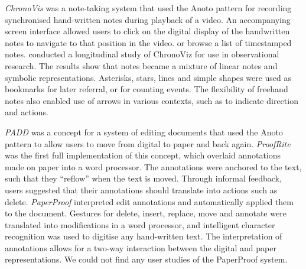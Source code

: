 \textit{ChronoVis} \citep{Fouse2011} was a note-taking system that used the Anoto pattern for recording synchronised
hand-written notes during playback of a video. An accompanying screen interface allowed users to click on the digital
display of the handwritten notes to navigate to that position in the video.  or browse a list of timestamped notes.
\citet{Weibel2012} conducted a longitudinal study of ChronoViz for use in observational research. The results show that
notes became a mixture of linear notes and symbolic representations.  Asterisks, stars, lines and simple shapes were
used as bookmarks for later referral, or for counting events.  The flexibility of freehand notes also enabled use of
arrows in various contexts, such as to indicate direction and actions.

\textit{PADD} \citep{Guimbretiere2003} was a concept for a system of editing documents that used the Anoto pattern to
allow users to move from digital to paper and back again.  \textit{ProofRite} \citep{Conroy2004} was the first full
implementation of this concept, which overlaid annotations made on paper into a word processor. The annotations were
anchored to the text, such that they ``reflow'' when the text is moved.  Through informal feedback, users suggested
that their annotations should translate into actions such as delete.  \textit{PaperProof} \citep{Weibel2008}
interpreted edit annotations and automatically applied them to the document.  Gestures for delete, insert, replace,
move and annotate were translated into modifications in a word processor, and intelligent character recognition was
used to digitise any hand-written text. The interpretation of annotations allows for a two-way interaction between the
digital and paper representations. We could not find any user studies of the PaperProof system.



